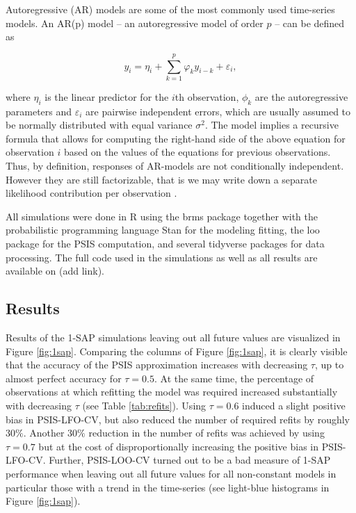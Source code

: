 \documentclass[american,]{article}
\begin{document}
Autoregressive (AR) models are some of the most commonly used time-series models.
An AR(p) model -- an autoregressive model of order \(p\) -- can be defined as

\begin{equation}
y_i = \eta_i + \sum_{k = 1}^p \varphi_k y_{i - k} + \varepsilon_i,
\end{equation}

where \(\eta_i\) is the linear predictor for the \(i\)th observation, \(\phi_k\) are
the autoregressive parameters and \(\varepsilon_i\) are pairwise independent
errors, which are usually assumed to be normally distributed with equal variance
\(\sigma^2\). The model implies a recursive formula that allows for computing the
right-hand side of the above equation for observation \(i\) based on the values of
the equations for previous observations. Thus, by definition, responses of
AR-models are not conditionally independent. However they are still
factorizable, that is we may write down a separate likelihood contribution per
observation \citep[see][ for more discussion on
factorizability of statistical models]{buerkner:non-factorizable}.

All simulations were done in R \citep{R2018} using the brms package \citep{brms1, brms2} together with the probabilistic programming language Stan
\citep{carpenter2017} for the modeling fitting, the loo package \citep{vehtari2017loo} for
the PSIS computation, and several tidyverse packages \citep{tidyverse} for data
processing. The full code used in the simulations as well as all results are
available on (add link).

\hypertarget{sim_results}{%
\subsection{Results}\label{sim_results}}

Results of the 1-SAP simulations leaving out all future values are visualized
in Figure \ref{fig:1sap}. Comparing the columns of Figure \ref{fig:1sap}, it
is clearly visible that the accuracy of the PSIS approximation increases with
decreasing \(\tau\), up to almost perfect accuracy for \(\tau = 0.5\). At the same
time, the percentage of observations at which refitting the model was required
increased substantially with decreasing \(\tau\) (see Table
\ref{tab:refits}). Using \(\tau = 0.6\) induced a slight positive
bias in PSIS-LFO-CV, but also reduced the number of required refits by roughly
\(30\%\). Another \(30\%\) reduction in the number of refits was achieved by
using \(\tau = 0.7\) but at the cost of disproportionally increasing the
positive bias in PSIS-LFO-CV. Further, PSIS-LOO-CV turned out to be a bad
measure of 1-SAP performance when leaving out all future values for all
non-constant models in particular those with a trend in the time-series (see
light-blue histograms in Figure \ref{fig:1sap}).
\end{document}
